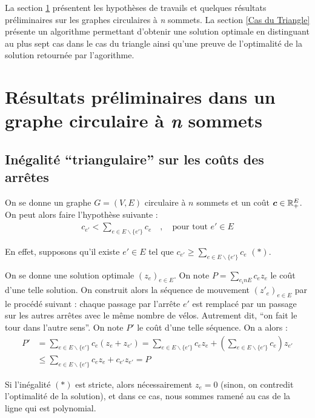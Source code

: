 \documentclass[twoside,11pt,openany,a4paper]{rapport}
\begin{document}
La section \ref{Résultats préliminaires} présentent les hypothèses de travails et quelques résultats préliminaires sur les graphes circulaires à \emph{n} sommets. La section \ref{Cas du Triangle} présente un algorithme permettant d'obtenir une solution optimale en distinguant au plus sept cas dans le cas du triangle ainsi qu'une preuve de l'optimalité de la solution retournée par l'agorithme.

\chapter{Résultats préliminaires dans un graphe circulaire à \textit{n} sommets}
\label{Résultats préliminaires}

\section{Inégalité ``triangulaire'' sur les coûts des arrêtes}

On se donne un graphe $G=(V,E)$ circulaire à $n$ sommets et un coût $\boldsymbol{c} \in \mathbb{R}^E_+$. On peut alors faire l'hypothèse suivante :
\begin{gather}\label{Inégalité Triangulaire}
  c_{e'}<\sum_{e \in E \backslash \{e'\}} c_e \quad , \quad \text{pour tout } e' \in E
\end{gather}

En effet, supposons qu'il existe $e' \in E$ tel que $c_{e'} \ge \sum_{e \in E \backslash \{e'\}} c_e$ $(*)$.

On se donne une solution optimale $(z_e)_{e \in E}$. On note $P = \sum_{e _in E} c_ez_e$ le coût d'une telle solution. On construit alors la séquence de mouvement $(z'_e)_{e \in E}$ par le procédé suivant : chaque passage par l'arrête $e'$ est remplacé par un passage sur les autres arrêtes avec le même nombre de vélos. Autrement dit, ``on fait le tour dans l'autre sens''. On note $P'$ le coût d'une telle séquence. On a alors :
\begin{align*}
  P' &= \sum_{e \in E \backslash \{e'\}} c_e (z_e + z_{e'}) = \sum_{e \in E \backslash \{e'\}} c_ez_e + \left(\sum_{e \in E \backslash \{e'\}} c_{e}\right)z_{e'} \\
     &\le \sum_{e \in E \backslash \{e'\}} c_ez_e + c_{e'}z_{e'} = P
\end{align*}

Si l'inégalité $(*)$ est stricte, alors nécessairement $z_e = 0$ (sinon, on contredit l'optimalité de la solution), et dans ce cas, nous sommes ramené au cas de la ligne qui est polynomial.
\end{document}
